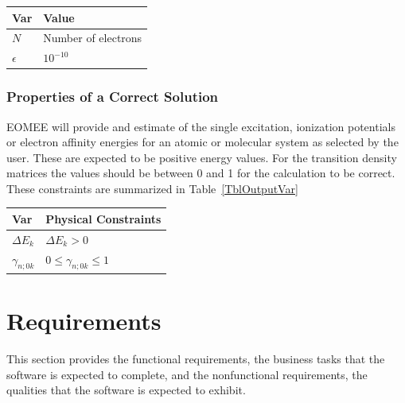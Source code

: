 \documentclass[12pt]{article}
\begin{document}
\begin{table}[!h]
\caption{Specification Parameter Values} \label{TblSpecParams}
\renewcommand{\arraystretch}{1.2}
\noindent \begin{longtable*}{l l} 
  \toprule
  \textbf{Var} & \textbf{Value} \\
  \midrule 
  $N$ & Number of electrons\\
  $\epsilon$ & $10^{-10}$\\
  \bottomrule
\end{longtable*}
\end{table}

\subsubsection{Properties of a Correct Solution} \label{sec_CorrectSolution}

\noindent
EOMEE will provide and estimate of the single excitation, ionization potentials 
or electron affinity energies for an atomic or molecular system as selected by 
the user. These are expected to be positive energy values. For the transition 
density matrices the values should be between 0 and 1 for the calculation to 
be correct.   
  These constraints are summarized in Table~\ref{TblOutputVar}

\begin{table}[!h]
\caption{Output Variables} \label{TblOutputVar}
\renewcommand{\arraystretch}{1.2}
\noindent \begin{longtable*}{l l} 
  \toprule
  \textbf{Var} & \textbf{Physical Constraints} \\
  \midrule 
  $\Delta E_k$& $\Delta E_k > 0$\\
  $\gamma_{n;0k}$ &$0\le \gamma_{n;0k} \le 1$\\
  \bottomrule
\end{longtable*}
\end{table}

\section{Requirements}


This section provides the functional requirements, the business tasks that the
software is expected to complete, and the nonfunctional requirements, the
qualities that the software is expected to exhibit.
\end{document}
